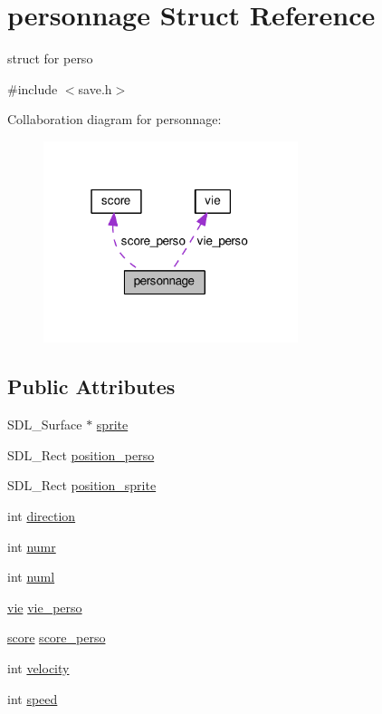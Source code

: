 \hypertarget{structpersonnage}{}\section{personnage Struct Reference}
\label{structpersonnage}


struct for perso  




{\ttfamily \#include $<$save.\+h$>$}



Collaboration diagram for personnage\+:\nopagebreak
\begin{figure}[H]
\begin{center}
\leavevmode
\includegraphics[width=211pt]{structpersonnage__coll__graph}
\end{center}
\end{figure}
\subsection*{Public Attributes}
\begin{DoxyCompactItemize}
\item 
S\+D\+L\+\_\+\+Surface $\ast$ \hyperlink{structpersonnage_a8adbc94f4634e562d2499a96c9513102}{sprite}
\item 
S\+D\+L\+\_\+\+Rect \hyperlink{structpersonnage_a4a45c9e4310d819fcd3c9a60fc8c0ebf}{position\+\_\+perso}
\item 
S\+D\+L\+\_\+\+Rect \hyperlink{structpersonnage_a6f6ed0df27eb1c8f5238c4f8fea3cde9}{position\+\_\+sprite}
\item 
int \hyperlink{structpersonnage_a2664acffa6fccd8487b9e03b63fbd6da}{direction}
\item 
int \hyperlink{structpersonnage_a65b13e52d4bab27bc25e35de373fa865}{numr}
\item 
int \hyperlink{structpersonnage_acac339d614a7ac8e987bc94d547d9e18}{numl}
\item 
\hyperlink{structvie}{vie} \hyperlink{structpersonnage_ac96f4aee44111bc31a7718e5762bf483}{vie\+\_\+perso}
\item 
\hyperlink{structscore}{score} \hyperlink{structpersonnage_a7ea99b7d0c8445cb3d7ba6717eb89d8c}{score\+\_\+perso}
\item 
int \hyperlink{structpersonnage_aa10eda88d070839448f1c429dbbffdae}{velocity}
\item 
int \hyperlink{structpersonnage_acb8e0ece93e2c7c15a1672e2867edc19}{speed}
\end{DoxyCompactItemize}


